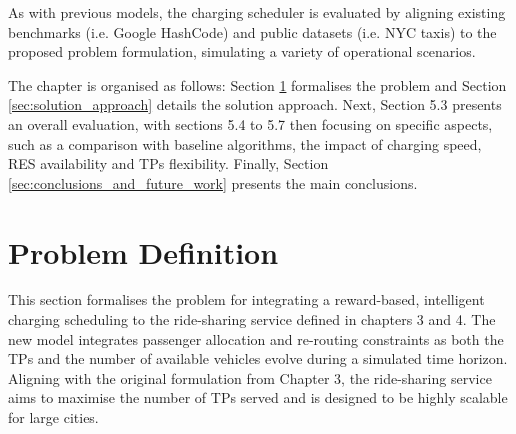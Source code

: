 As with previous models, the charging scheduler is evaluated by aligning existing benchmarks (i.e. Google HashCode) and public datasets (i.e. NYC taxis) to the proposed problem formulation, simulating a variety of operational scenarios.

The chapter is organised as follows: Section \ref{sec:problem_definition} formalises the problem and Section \ref{sec:solution_approach} details the solution approach. Next, Section 5.3 presents an overall evaluation, with sections 5.4 to 5.7 then focusing on specific aspects, such as a comparison with baseline algorithms, the impact of charging speed, RES availability and TPs flexibility.  Finally, Section \ref{sec:conclusions_and_future_work} presents the main conclusions.


\section{Problem Definition}
\label{sec:problem_definition}

This section formalises the problem for integrating a reward-based, intelligent charging scheduling to the ride-sharing service defined in chapters 3 and 4. The new model integrates passenger allocation and re-routing constraints as both the TPs and the number of available vehicles evolve during a simulated time horizon. Aligning with the original formulation from Chapter 3, the ride-sharing service aims to maximise the number of TPs served and is designed to be highly scalable for large cities.

